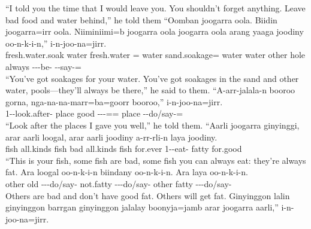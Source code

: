 \begin{exye}
\ft ``I told you the time that I would leave you. You shouldn't forget anything. Leave bad food and water behind,'' he told them
\exy {}%
\gll ``Oomban joogarra oola. Biidin joogarra=irr oola. Niiminiimi=b joogarra oola joogarra oola arang yaaga joodiny oo-n-k-i-n,'' i-n-joo-na=jirr.\\
fresh.water.soak  water fresh.water = water sand.soakage=  water  water other hole always ---be- --say-=\\
\ft ``You've got soakages for your water. You've got soakages in the sand and other water, pools---they'll always be there,'' he said to them.
\exy {}
\gll ``A-arr-jalala-n booroo gorna, nga-na-na-marr=ba=goorr booroo,'' i-n-joo-na=jirr.\\
1--look.after- place good ---== place --do/say-=\\
\ft ``Look after  the places I gave you well,'' he told them.
\exy {}
\gll ``Aarli joogarra ginyinggi, arar aarli loogal, arar aarli joodiny a-rr-rli-n laya joodiny.\\
fish   all.kinds fish bad all.kinds fish for.ever 1--eat- fatty for.good\\
\ft ``This is your fish, some fish are bad, some fish you can always eat: they're always fat.
\exy {}
\gll Ara loogal oo-n-k-i-n biindany oo-n-k-i-n. Ara laya oo-n-k-i-n.\\
other old ---do/say- not.fatty ---do/say- other fatty ---do/say-\\
\ft Others are bad and don't have good fat. Others will get fat.
\exy {}
\gll Ginyinggon lalin ginyinggon barrgan ginyinggon jalalay boonyja=jamb arar joogarra aarli,'' i-n-joo-na=jirr.\\

\end{exye}
